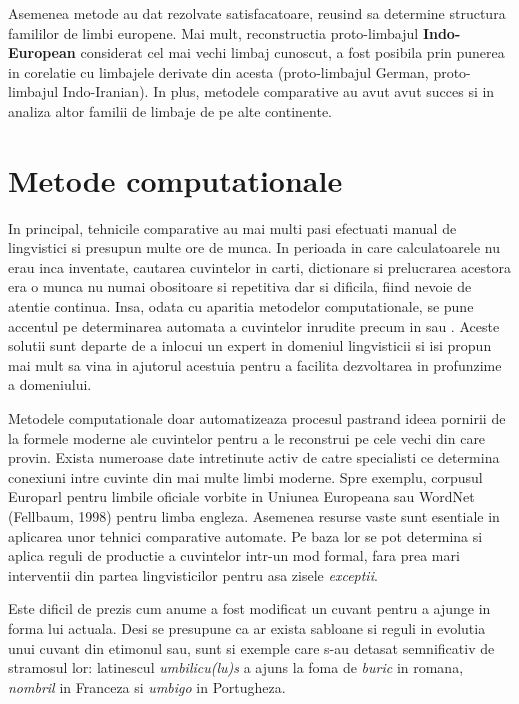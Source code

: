 Asemenea metode au dat rezolvate satisfacatoare, reusind sa determine structura famililor de limbi
europene. Mai mult, reconstructia proto-limbajul \textbf{Indo-European} considerat cel mai vechi
limbaj cunoscut, a fost posibila prin punerea in corelatie cu limbajele derivate din acesta 
(proto-limbajul German, proto-limbajul Indo-Iranian).\cite{protostuff} In plus, metodele comparative
au avut avut succes si in analiza altor familii de limbaje de pe alte continente.

\section{Metode computationale}
In principal, tehnicile comparative au mai multi pasi efectuati manual de lingvistici si presupun 
multe ore de munca. In perioada in care calculatoarele nu erau inca inventate, cautarea cuvintelor 
in carti, dictionare si prelucrarea acestora era o munca nu numai obositoare si repetitiva dar si 
dificila, fiind nevoie de atentie continua. Insa, odata cu aparitia metodelor computationale, se pune accentul
pe determinarea automata a cuvintelor inrudite precum in \cite{kondrak} sau \cite{list}. Aceste
solutii sunt departe de a inlocui un expert in domeniul lingvisticii si isi propun mai mult sa vina
in ajutorul acestuia pentru a facilita dezvoltarea in profunzime a domeniului.

Metodele computationale doar automatizeaza procesul pastrand ideea pornirii de la formele moderne
ale cuvintelor pentru a le reconstrui pe cele vechi din care provin. Exista numeroase date intretinute
activ de catre specialisti ce determina conexiuni intre cuvinte din mai multe limbi moderne. Spre
exemplu, corpusul Europarl pentru limbile oficiale vorbite in Uniunea Europeana sau WordNet (Fellbaum, 1998)
pentru limba engleza. Asemenea resurse vaste sunt esentiale in aplicarea unor tehnici comparative 
automate. Pe baza lor se pot determina si aplica reguli de productie a cuvintelor intr-un mod formal,
fara prea mari interventii din partea lingvisticilor pentru asa zisele \textit{exceptii}.

Este dificil de prezis cum anume a fost modificat un cuvant pentru a ajunge in forma lui actuala.
Desi se presupune ca ar exista sabloane si reguli in evolutia unui cuvant din etimonul sau, sunt
si exemple care s-au detasat semnificativ de stramosul lor: latinescul \textit{umbilicu(lu)s} a ajuns
la foma de \textit{buric} in romana, \textit{nombril} in Franceza si \textit{umbigo} in Portugheza.

